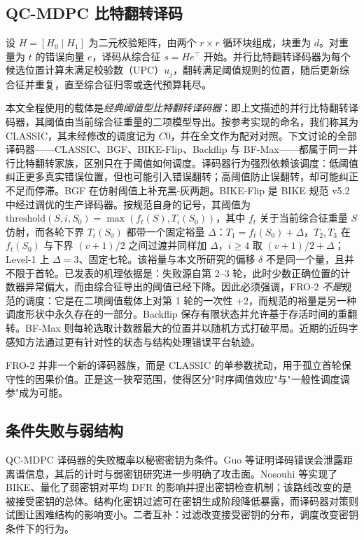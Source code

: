 \documentclass[UTF8,a4paper,10pt,twocolumn]{ctexart}
\begin{document}
\subsection{QC-MDPC 比特翻转译码}

设 $H=[H_0\mid H_1]$ 为二元校验矩阵，由两个 $r\times r$ 循环块组成，块重为 $d$。对重量为 $t$ 的错误向量 $e$，译码从综合征 $s=He^{\top}$ 开始。并行比特翻转译码器为每个候选位置计算未满足校验数（UPC）$u_j$，翻转满足阈值规则的位置，随后更新综合征并重复，直至综合征归零或迭代预算耗尽。

本文全程使用的载体是\emph{经典阈值型比特翻转译码器}：即上文描述的并行比特翻转译码器，其阈值由当前综合征重量的二项模型导出\cite{misoczki2013mdpc,vasseur2021thesis}。按参考实现的命名，我们称其为 CLASSIC，其未经修改的调度记为 $C0$，并在全文作为配对对照。下文讨论的全部译码器——CLASSIC、BGF、BIKE-Flip、Backflip 与 BF-Max——都属于同一并行比特翻转家族，区别只在于阈值如何调度。译码器行为强烈依赖该调度：低阈值纠正更多真实错误位置，但也可能引入错误翻转；高阈值防止误翻转，却可能纠正不足而停滞。BGF 在仿射阈值上补充黑-灰两趟\cite{drucker2020shades}。BIKE-Flip 是 BIKE 规范 v5.2 中经过调优的生产译码器\cite{bike2024spec}。按规范自身的记号，其阈值为 $\mathrm{threshold}(S,i,S_0)=\max(f_t(S),T_i(S_0))$，其中 $f_t$ 关于当前综合征重量 $S$ 仿射，而各轮下界 $T_i(S_0)$ 都带一个固定裕量 $\Delta$：$T_1=f_t(S_0)+\Delta$，$T_2,T_3$ 在 $f_t(S_0)$ 与下界 $(v{+}1)/2$ 之间过渡并同样加 $\Delta$，$i\ge4$ 取 $(v{+}1)/2+\Delta$；Level-1 上 $\Delta=3$、固定七轮。该裕量与本文所研究的偏移 $\delta$ 不是同一个量，且并不限于首轮。已发表的机理依据是：失败源自第 2--3 轮，此时少数正确位置的计数器异常偏大，而由综合征导出的阈值已经下降\cite{sendrier2024seminar}。因此必须强调，FRO-2 \emph{不是}规范的调度：它是在二项阈值载体上对第 1 轮的一次性 $+2$，而规范的裕量是另一种调度形状中永久存在的一部分。Backflip 保存有限状态并允许基于存活时间的重翻转\cite{sendrier2020lowdfr}。BF-Max 则每轮选取计数器最大的位置并以随机方式打破平局\cite{baldelli2025bfmax}。近期的近码字感知方法通过更有针对性的状态与结构处理错误平台轨迹\cite{baldelli2026ncw,santini2026flip}。

FRO-2 并非一个新的译码器族，而是 CLASSIC 的单参数扰动，用于孤立首轮保守性的因果价值。正是这一狭窄范围，使得区分"时序阈值效应"与"一般性调度调参"成为可能。

\subsection{条件失败与弱结构}

QC-MDPC 译码器的失败概率以秘密密钥为条件。Guo 等证明译码错误会泄露距离谱信息\cite{guo2016key}，其后的计时与弱密钥研究进一步明确了攻击面\cite{eaton2018timing,wang2023weak,gellersen2025}。Nosouhi 等实现了 BIKE、量化了弱密钥对平均 DFR 的影响并提出密钥检查机制；该路线改变的是被接受密钥的总体\cite{nosouhi2023weakkey}。结构化密钥过滤可在密钥生成阶段降低暴露\cite{matthews2025combinatorial}，而译码器对策则试图让困难结构的影响变小。二者互补：过滤改变接受密钥的分布，调度改变密钥条件下的行为。
\end{document}

